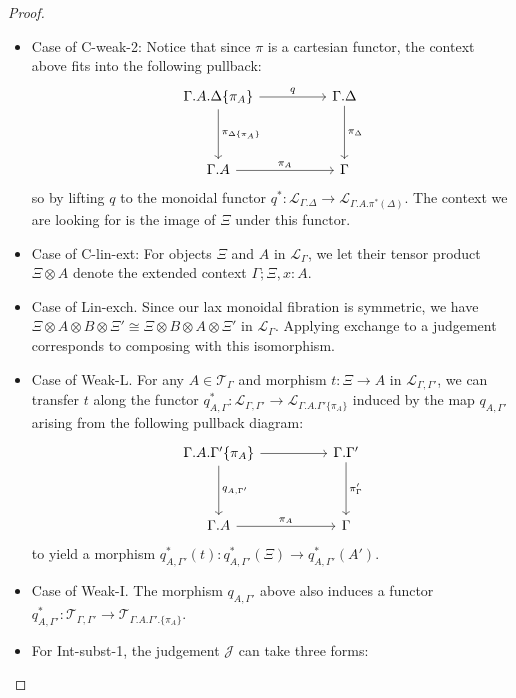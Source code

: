 \begin{thm}[Soundness]
\begin{proof}
\begin{itemize}
\item Case of C-weak-2: Notice that since $\pi$ is a cartesian functor, the context above fits into the following pullback:
\[
\ti
\Gamma.A.\Delta\{\pi_A\} \ar[r, "q"] \ar[d, "\pi_{\Delta\{\pi_A\}}"]  & \Gamma.\Delta \ar[d, "\pi_\Delta"]\\
\Gamma.A \ar[r, "\pi_A"] & \Gamma
\kz
\]
so by lifting $q$ to the monoidal functor $q^* : \mathcal{L}_{\Gamma.\Delta} \to \mathcal{L}_{\Gamma.A.\pi^*(\Delta)}$. The context we are looking for is the image of $\Xi$ under this functor.
\item Case of C-lin-ext: For objects $\Xi$ and $A$ in $\mathcal{L}_{\Gamma}$, we let their tensor product $\Xi \otimes A$ denote the extended context $\Gamma; \Xi, x : A$.
\item Case of Lin-exch. Since our lax monoidal fibration is symmetric, we have $\Xi \otimes A \otimes B \otimes \Xi' \cong \Xi \otimes B \otimes A \otimes \Xi'$ in $\mathcal{L}_{\Gamma}$. Applying exchange to a judgement corresponds to composing with this isomorphism.
\item Case of Weak-L. For any $A \in \mathcal{T}_{\Gamma}$ and morphism $t : \Xi \to A$ in $\mathcal{L}_{\Gamma, \Gamma'}$, we can transfer $t$ along the functor $q_{A, \Gamma}^* : \mathcal{L}_{\Gamma, \Gamma'} \to \mathcal{L}_{\Gamma.A.\Gamma'\{\pi_A\}}$ induced by the map $q_{A, \Gamma'}$ arising from the following pullback diagram:
\[
\ti
\Gamma.A.\Gamma'\{\pi_A\} \ar[r] \ar[d, "q_{A, \Gamma'}"]  & \Gamma.\Gamma' \ar[d, "\pi_\Gamma'"]\\
\Gamma.A \ar[r, "\pi_A"] & \Gamma
\kz
\]
to yield a morphism $q_{A, \Gamma'}^*(t) : q_{A, \Gamma'}^*(\Xi) \to q_{A, \Gamma'}^*(A')$.
\item Case of Weak-I. The morphism $q_{A, \Gamma'}$ above also induces a functor $q_{A, \Gamma'}^* : \mathcal{T}_{\Gamma, \Gamma'} \to \mathcal{T}_{\Gamma.A.\Gamma'.\{\pi_A\}}$.
\item For Int-subst-1, the judgement $\mathcal{J}$ can take three forms:

\end{itemize}
\end{proof}
\end{thm}
